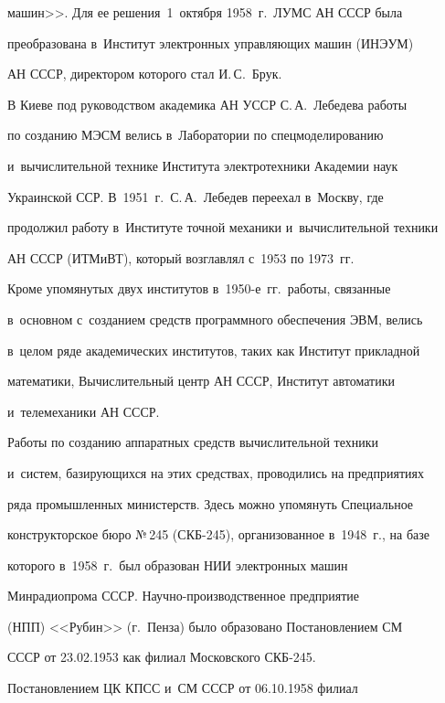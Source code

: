 машин>>. Для ее решения~1~октября 1958~г.\ ЛУМС АН \mbox{СССР} была 

преобразована в~Институт электронных управ\-ля\-ющих машин (ИНЭУМ) 

АН СССР, директором которого стал И.\,С.~Брук.

   

   В Киеве под руководством академика АН УССР С.\,А.~Лебедева работы 

по созданию МЭСМ велись в~Лаборатории по спецмоделированию 

и~вы\-чис\-ли\-тель\-ной технике Института электротехники Академии наук 

Украинской ССР. В~1951~г.\ С.\,А.~Лебедев переехал в~Москву, где 

продолжил работу в~Институте точ\-ной механики и~вы\-чис\-ли\-тель\-ной техники 

АН СССР (ИТМиВТ), который воз\-глав\-лял с~1953 по 1973~гг.

   

   Кроме упомянутых двух институтов в~1950-е~гг.\ работы, связанные 

в~основ\-ном с~созданием средств программного обеспечения ЭВМ, велись 

в~целом ряде академических институтов, таких как Институт при\-клад\-ной 

математики, Вы\-чис\-ли\-тель\-ный центр АН СССР, Институт автоматики 

и~телемеханики АН СССР. 

   

   Работы по созданию аппаратных средств вы\-чис\-ли\-тель\-ной техники 

и~сис\-тем, базирующихся на этих средствах, проводились на предприятиях 

ряда промышленных министерств. Здесь мож\-но упомянуть Специальное 

конструкторское бюро №\,245 (СКБ-245), организованное в~1948~г., на базе 

которого в~1958~г.\ был образован НИИ электронных машин 

Минрадиопрома СССР. На\-уч\-но-про\-из\-вод\-ст\-вен\-ное предприятие 

(НПП) <<Рубин>> (г.~Пенза) было образовано По\-ста\-нов\-ле\-ни\-ем СМ 

\mbox{СССР} от 23.02.1953 как филиал Московского \mbox{СКБ-245}. 

По\-ста\-нов\-ле\-ни\-ем ЦК \mbox{КПСС} и~СМ \mbox{СССР} от 06.10.1958 филиал 

